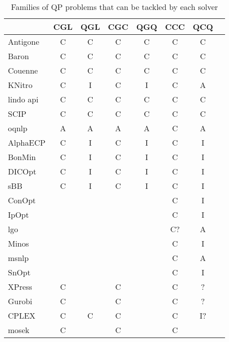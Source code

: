 \begin{table}
{
 \centering                
 \scriptsize                
 \setlength{\tabcolsep}{3pt}                
                
\begin{tabular}{lccccccc}
\toprule  
                 & CGL & QGL & CGC & QGQ & CCC & QCQ \\
\hline
{\sc Antigone}    &  C  &  C  &  C  &  C  &  C  &  C  \\
{\sc Baron}       &  C  &  C  &  C  &  C  &  C  &  C  \\
{\sc Couenne}     &  C  &  C  &  C  &  C  &  C  &  C  \\
{\sc KNitro}      &  C  &  I  &  C  &  I  &  C  &  A  \\
{\sc lindo api}   &  C  &  C  &  C  &  C  &  C  &  C  \\
{\sc SCIP}        &  C  &  C  &  C  &  C  &  C  &  C  \\
{\sc oqnlp}       &  A  &  A  &  A  &  A  &  C  &  A  \\
{\sc AlphaECP}    &  C  &  I  &  C  &  I  &  C  &  I  \\
{\sc BonMin}      &  C  &  I  &  C  &  I  &  C  &  I  \\
{\sc DICOpt}      &  C  &  I  &  C  &  I  &  C  &  I  \\
{\sc sBB}         &  C  &  I  &  C  &  I  &  C  &  I  \\
{\sc ConOpt}      &     &     &     &     &  C  &  I  \\
{\sc IpOpt}       &     &     &     &     &  C  &  I  \\
{\sc lgo}         &     &     &     &     &  C? &  A  \\  %
{\sc Minos}       &     &     &     &     &  C  &  I  \\
{\sc msnlp}       &     &     &     &     &  C  &  A  \\
{\sc SnOpt}       &     &     &     &     &  C  &  I  \\
{\sc XPress}      &  C  &     &  C  &     &  C  &  ?  \\ %
{\sc Gurobi}      &  C  &     &  C  &     &  C  &  ?  \\ %
{\sc CPLEX}       &  C  &  C  &  C  &     &  C  &  I? \\ %
{\sc mosek}       &  C  &     &  C  &     &  C  &     \\
\hline
\end{tabular}                 
\caption{Families of QP problems that can be tackled by each solver} \label{t:solvers}
} 

\end{table}              

